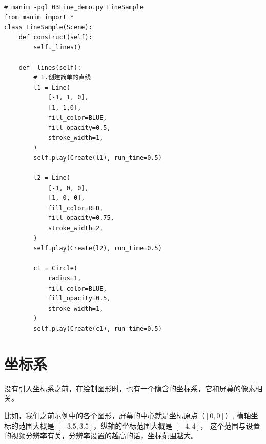 \begin{lstlisting}[style=pythonstyle]
# manim -pql 03Line_demo.py LineSample
from manim import *
class LineSample(Scene):
    def construct(self):
        self._lines()

    def _lines(self):
        # 1.创建简单的直线
        l1 = Line(
            [-1, 1, 0],
            [1, 1,0],
            fill_color=BLUE,
            fill_opacity=0.5,
            stroke_width=1,
        )
        self.play(Create(l1), run_time=0.5)

        l2 = Line(
            [-1, 0, 0],
            [1, 0, 0],
            fill_color=RED,
            fill_opacity=0.75,
            stroke_width=2,
        )
        self.play(Create(l2), run_time=0.5)

        c1 = Circle(
            radius=1,
            fill_color=BLUE,
            fill_opacity=0.5,
            stroke_width=1,
        )
        self.play(Create(c1), run_time=0.5)
\end{lstlisting}        


\section{坐标系}
\label{sec:Manim基本图形-坐标系}
没有引入坐标系之前，在绘制图形时，也有一个隐含的坐标系，它和屏幕的像素相关。

比如，我们之前示例中的各个图形，屏幕的中心就是坐标原点（$[0, 0]$）, 
横轴坐标的范围大概是 $[-3.5, 3.5]$，纵轴的坐标范围大概是 $[-4, 4]$，
这个范围与设置的视频分辨率有关，分辨率设置的越高的话，坐标范围越大。

